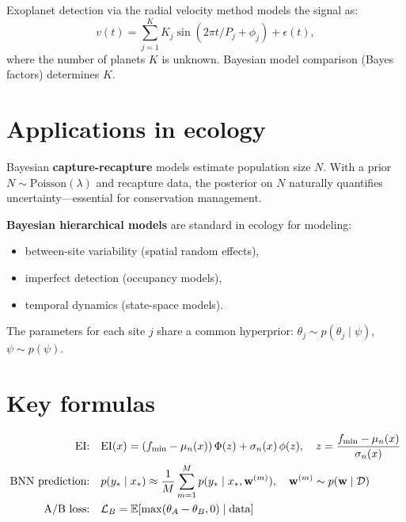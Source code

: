 \begin{example}
Exoplanet detection via the radial velocity method models the signal as:
\[
  v(t) = \sum_{j=1}^{K} K_j \sin(2\pi t / P_j + \phi_j) + \epsilon(t),
\]
where the number of planets $K$ is unknown. Bayesian model comparison
(Bayes factors) determines $K$.
\end{example}

\section{Applications in ecology}

\begin{example}
Bayesian \textbf{capture-recapture} models estimate population size $N$.
With a prior $N \sim \mathrm{Poisson}(\lambda)$ and recapture data, the
posterior on $N$ naturally quantifies uncertainty---essential for
conservation management.
\end{example}

\begin{definition}
\textbf{Bayesian hierarchical models} are standard in ecology for modeling:
\begin{itemize}
  \item between-site variability (spatial random effects),
  \item imperfect detection (occupancy models),
  \item temporal dynamics (state-space models).
\end{itemize}
The parameters for each site $j$ share a common hyperprior:
$\theta_j \sim p(\theta_j \mid \psi)$, $\psi \sim p(\psi)$.
\end{definition}

\section{Key formulas}

\begin{keyformulas}
\begin{align}
  \text{EI:} \quad & \mathrm{EI}(x) = (f_{\min} - \mu_n(x))\,\Phi(z) + \sigma_n(x)\,\phi(z),
    \quad z = \frac{f_{\min} - \mu_n(x)}{\sigma_n(x)} \\
  \text{BNN prediction:} \quad & p(y_* \mid x_*) \approx
    \frac{1}{M}\sum_{m=1}^M p(y_* \mid x_*, \mathbf{w}^{(m)}),
    \quad \mathbf{w}^{(m)} \sim p(\mathbf{w} \mid \mathcal{D}) \\
  \text{A/B loss:} \quad & \mathcal{L}_B = \mathbb{E}[\max(\theta_A - \theta_B, 0) \mid \text{data}]
\end{align}
\end{keyformulas}

